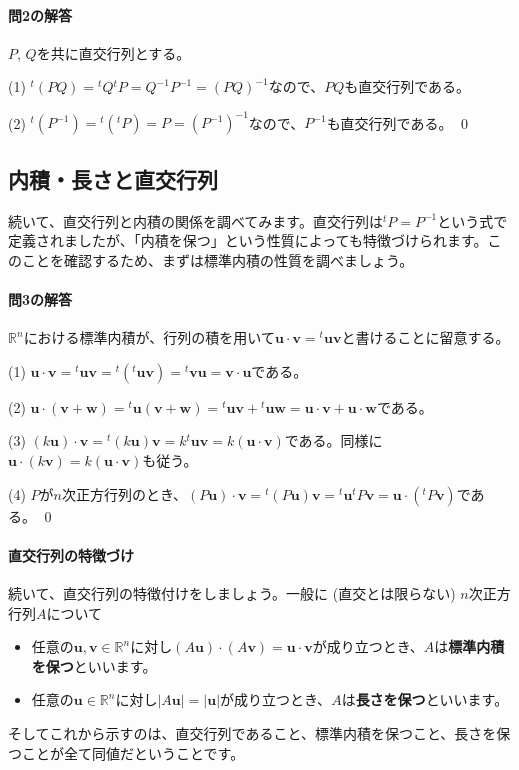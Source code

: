 \paragraph{問2の解答} $P$, $Q$を共に直交行列とする。

\noindent (1) ${}^t(PQ) = {}^tQ {}^tP = Q^{-1} P^{-1} = (PQ)^{-1}$なので、$PQ$も直交行列である。

\noindent (2) ${}^t(P^{-1}) = {}^t({}^tP) = P = (P^{-1})^{-1}$なので、$P^{-1}$も直交行列である。 \qed

\subsection{内積・長さと直交行列}

続いて、直交行列と内積の関係を調べてみます。直交行列は${}^t P = P^{-1}$という式で定義されましたが、「内積を保つ」という性質によっても特徴づけられます。このことを確認するため、まずは標準内積の性質を調べましょう。

\paragraph{問3の解答} $\mathbb{R}^n$における標準内積が、行列の積を用いて$\bm{u} \cdot \bm{v} = {}^t\bm{u} \bm{v}$と書けることに留意する。

\noindent (1) $\bm{u} \cdot \bm{v} = {}^t\bm{u} \bm{v} = {}^t({}^t\bm{u} \bm{v}) = {}^t\bm{v} \bm{u} = \bm{v} \cdot \bm{u}$である。

\noindent (2) $\bm{u} \cdot (\bm{v} + \bm{w}) = {}^t\bm{u}(\bm{v} + \bm{w}) = {}^t\bm{u} \bm{v} + {}^t\bm{u} \bm{w} = \bm{u} \cdot \bm{v} + \bm{u} \cdot \bm{w}$である。

\noindent (3) $(k\bm{u}) \cdot \bm{v} = {}^t(k\bm{u}) \bm{v} = k{}^t\bm{u} \bm{v} = k(\bm{u} \cdot \bm{v})$である。同様に$\bm{u} \cdot (k\bm{v}) = k(\bm{u} \cdot \bm{v})$も従う。

\noindent (4) $P$が$n$次正方行列のとき、$(P\bm{u}) \cdot \bm{v} = {}^t(P\bm{u}) \bm{v} = {}^t\bm{u} {}^tP \bm{v} = \bm{u} \cdot ({}^tP \bm{v})$である。 \qed

\paragraph{直交行列の特徴づけ}

続いて、直交行列の特徴付けをしましょう。一般に (直交とは限らない) $n$次正方行列$A$について
\begin{itemize}
\item 任意の$\bm{u}, \bm{v} \in \mathbb{R}^n$に対し$(A\bm{u}) \cdot (A\bm{v}) = \bm{u} \cdot \bm{v}$が成り立つとき、$A$は\textbf{標準内積を保つ}といいます。
\item 任意の$\bm{u} \in \mathbb{R}^n$に対し$|A\bm{u}| = |\bm{u}|$が成り立つとき、$A$は\textbf{長さを保つ}といいます。
\end{itemize}
そしてこれから示すのは、直交行列であること、標準内積を保つこと、長さを保つことが全て同値だということです。

